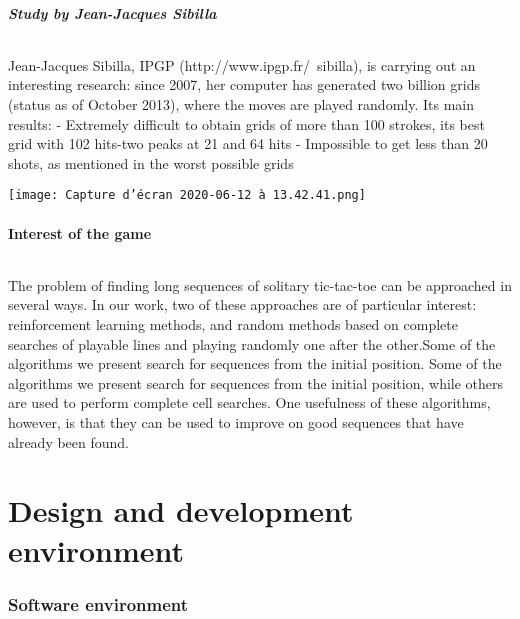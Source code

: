 \documentclass{article}
\begin{document}
\subsubsection{Study by Jean-Jacques Sibilla}
\paragraph{}
\setlength{\parindent}{2cm}
Jean-Jacques Sibilla, IPGP (http://www.ipgp.fr/~sibilla), is carrying out an
interesting research: since 2007, her computer has generated two
billion grids (status as of October 2013), where the moves are played
randomly. Its main results:
\newline
- Extremely difficult to obtain grids of more than 100 strokes, its
best grid with 102 hits-two peaks at 21 and 64 hits
\newline
- Impossible to get less than 20 shots, as mentioned in the
worst possible grids
~\cite{score} 
\begin{center}
\centering
\texttt{[image: Capture d’écran 2020-06-12 à 13.42.41.png]}
\label{fig:ucp}\\%
\end{center}

\subsection{Interest of the game}
\paragraph{}
\setlength{\parindent}{2cm}
The problem of finding long sequences of solitary tic-tac-toe can be approached in several ways. In our work, two of these approaches are of particular interest: reinforcement learning methods, and random methods based on complete searches of playable lines and playing randomly one after the other.Some of the algorithms we present search for sequences from the initial position. Some of the algorithms we present search for sequences from the initial position, while others are used to perform complete cell searches. One usefulness of these algorithms, however, is that they can be used to improve on good sequences that have already been found. ~\cite{these} 
\newpage
\part{Design and development environment}
\section{Software environment}
\end{document}
